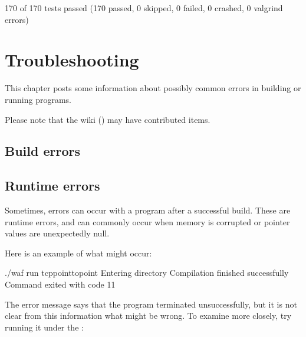 \documentclass[letterpaper,10pt,english]{sphinxmanual}
\begin{document}
\begin{sphinxVerbatim}[commandchars=\\\{\}]
170 of 170 tests passed (170 passed, 0 skipped, 0 failed, 0 crashed, 0 valgrind errors)
\end{sphinxVerbatim}


\section{Troubleshooting}
\label{\detokenize{troubleshoot:troubleshooting}}\label{\detokenize{troubleshoot::doc}}
This chapter posts some information about possibly common errors in building
or running  programs.

Please note that the wiki
() may have contributed
items.


\subsection{Build errors}
\label{\detokenize{troubleshoot:build-errors}}

\subsection{Run\sphinxhyphen{}time errors}
\label{\detokenize{troubleshoot:run-time-errors}}
Sometimes, errors can occur with a program after a successful build. These are
run\sphinxhyphen{}time errors, and can commonly occur when memory is corrupted or pointer
values are unexpectedly null.

Here is an example of what might occur:

\begin{sphinxVerbatim}[commandchars=\\\{\}]
\PYGZdl{} ./waf \PYGZhy{}\PYGZhy{}run tcp\PYGZhy{}point\PYGZhy{}to\PYGZhy{}point
Entering directory 
Compilation finished successfully
Command \PYG{o}{[}\PYG{o}{]} exited with code \PYGZhy{}11
\end{sphinxVerbatim}

The error message says that the program terminated unsuccessfully, but it is
not clear from this information what might be wrong. To examine more
closely, try running it under the :
\end{document}
